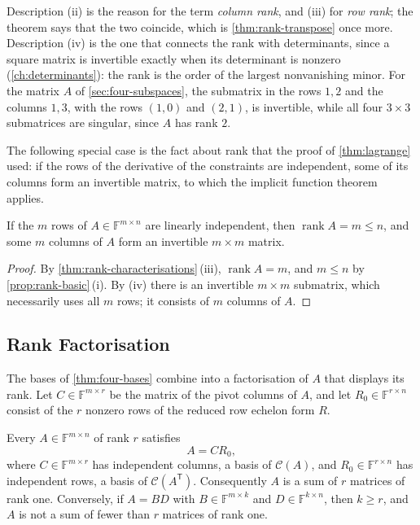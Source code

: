 Description (ii) is the reason for the term \emph{column rank}, and (iii) for \emph{row rank}; the theorem says that the two coincide, which is \cref{thm:rank-transpose} once more. Description (iv) is the one that connects the rank with determinants, since a square matrix is invertible exactly when its determinant is nonzero (\cref{ch:determinants}): the rank is the order of the largest nonvanishing minor. For the matrix $A$ of \cref{sec:four-subspaces}, the submatrix in the rows $1,2$ and the columns $1,3$, with the rows $(1,0)$ and $(2,1)$, is invertible, while all four $3\times3$ submatrices are singular, since $A$ has rank $2$.

The following special case is the fact about rank that the proof of \cref{thm:lagrange} used: if the rows of the derivative of the constraints are independent, some of its columns form an invertible matrix, to which the implicit function theorem applies.

\begin{corollary}
\label{cor:independent-rows}
If the $m$ rows of $A\in\mathbb F^{m\times n}$ are linearly independent, then $\operatorname{rank}A=m\le n$, and some $m$ columns of $A$ form an invertible $m\times m$ matrix.
\end{corollary}

\begin{proof}
By \cref{thm:rank-characterisations}\,(iii), $\operatorname{rank}A=m$, and $m\le n$ by \cref{prop:rank-basic}\,(i). By (iv) there is an invertible $m\times m$ submatrix, which necessarily uses all $m$ rows; it consists of $m$ columns of $A$.
\end{proof}

\subsection{Rank Factorisation}

The bases of \cref{thm:four-bases} combine into a factorisation of $A$ that displays its rank. Let $C\in\mathbb F^{m\times r}$ be the matrix of the pivot columns of $A$, and let $R_0\in\mathbb F^{r\times n}$ consist of the $r$ nonzero rows of the reduced row echelon form $R$.

\begin{theorem}
\label{thm:rank-factorisation}
Every $A\in\mathbb F^{m\times n}$ of rank $r$ satisfies
\[
A=CR_0,
\]
where $C\in\mathbb F^{m\times r}$ has independent columns, a basis of $\mathcal C(A)$, and $R_0\in\mathbb F^{r\times n}$ has independent rows, a basis of $\mathcal C(A^{\mathsf T})$. Consequently $A$ is a sum of $r$ matrices of rank one. Conversely, if $A=BD$ with $B\in\mathbb F^{m\times k}$ and $D\in\mathbb F^{k\times n}$, then $k\ge r$, and $A$ is not a sum of fewer than $r$ matrices of rank one.
\end{theorem}

